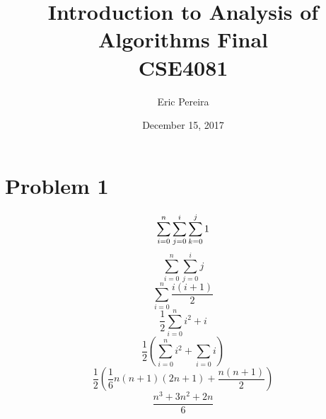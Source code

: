 \documentclass[letterpaper,oneside,10pt]{article}
\begin{document}
\pagestyle{empty} %



\title{Introduction to Analysis of Algorithms Final\\CSE4081}
\author{Eric Pereira}
\date{December 15, 2017} %
\maketitle
\newpage



\tableofcontents %
\cleardoublepage %

\pagestyle{plain} %


\section{Problem 1}
\label{sec:Problem 1}

\begin{equation*}
\sum_{i=0}^{n} \sum_{j=0}^{i} \sum_{k=0}^{j} 1 \\
\end{equation*}
\begin{equation*}
\sum_{i=0}^{n} \sum_{j=0}^{i} j
\end{equation*}
\begin{equation*}
\sum_{i=0}^{n} \frac{i(i+1)}{2}
\end{equation*}
\begin{equation*}
\frac{1}{2} \sum_{i=0}^{n} i^{2}+i
\end{equation*}
\begin{equation*}
\frac{1}{2} (\sum_{i=0}^{n} i^{2} + \sum_{i=0} i)
\end{equation*}
\begin{equation*}
\frac{1}{2} (\frac{1}{6}n(n+1)(2n+1) + \frac{n(n+1)}{2})
\end{equation*}
\begin{equation*}
\frac{n^{3} + 3n^{2} + 2n}{6}
\end{equation*}
\end{document}
